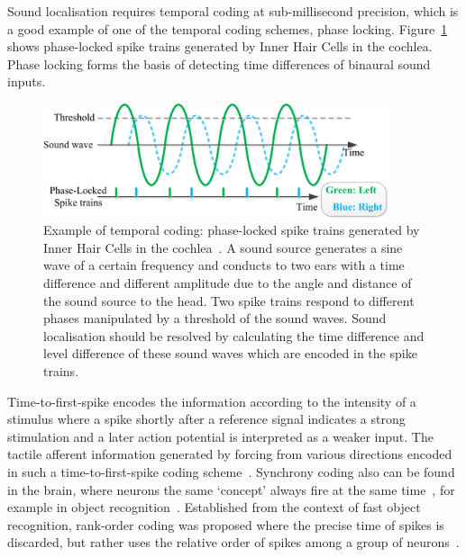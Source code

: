 Sound localisation requires temporal coding at sub-millisecond precision, which is a good example of one of the temporal coding schemes, phase locking.
Figure~\ref{Fig:audio_fibre} shows phase-locked spike trains generated by Inner Hair Cells in the cochlea.
Phase locking forms the basis
of detecting time differences of binaural sound inputs.
\begin{figure}[bt]
	\centering
	\includegraphics[width=0.9\textwidth]{pics_snn/phaselocking.png}
	\caption{Example of temporal coding: phase-locked spike trains generated by Inner Hair Cells in the cochlea~\citep{liu2013modeling}.
	A sound source generates a sine wave of a certain frequency and conducts to two ears with a time difference and different amplitude due to the angle and distance of the sound source to the head.
	Two spike trains respond to different phases manipulated by a threshold of the sound waves.
	Sound localisation should be resolved by calculating the time difference and level difference of these sound waves which are encoded in the spike trains.
    }
	\label{Fig:audio_fibre}
\end{figure}

Time-to-first-spike encodes the information according to the intensity of a stimulus where a spike shortly after a reference signal indicates a strong stimulation and a later action potential is interpreted as a weaker input.
The tactile afferent information generated by forcing \protect{} \protect{} from various directions \protect{} \protect{} encoded in such a time-to-first-spike coding scheme~\citep{johansson2004first}.
Synchrony coding also can be found in the brain, where neurons \protect{} \protect{} the same `concept' always fire at the same time~\citep{von1994correlation}, for example in object recognition~\citep{gray1989stimulus}.
Established from the context of fast object recognition, rank-order coding was proposed where the precise time of spikes is discarded, but rather uses the relative order of spikes among a group of neurons~\citep{gautrais1998rate}.


